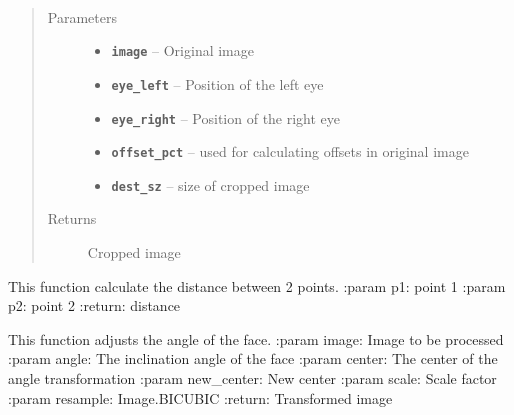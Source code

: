 \documentclass[letterpaper,10pt,english]{sphinxmanual}
\begin{document}
\begin{fulllineitems}
\label{Documentation of Code:preProcess.adjust.CropFace}~\begin{quote}\begin{description}
\item[{Parameters}] \leavevmode\begin{itemize}
\item {} 
\textbf{\texttt{image}} -- Original image

\item {} 
\textbf{\texttt{eye\_left}} -- Position of the left eye

\item {} 
\textbf{\texttt{eye\_right}} -- Position of the right eye

\item {} 
\textbf{\texttt{offset\_pct}} -- used for calculating offsets in original image

\item {} 
\textbf{\texttt{dest\_sz}} -- size of cropped image

\end{itemize}

\item[{Returns}] \leavevmode
Cropped image

\end{description}\end{quote}

\end{fulllineitems}


\begin{fulllineitems}
\label{Documentation of Code:preProcess.adjust.Distance}
This function calculate the distance between 2 points.
:param p1: point 1
:param p2: point 2
:return: distance

\end{fulllineitems}


\begin{fulllineitems}
\label{Documentation of Code:preProcess.adjust.ScaleRotateTranslate}
This function adjusts the angle of the face.
:param image: Image to be processed
:param angle: The inclination angle of the face
:param center: The center of the angle transformation
:param new\_center: New center
:param scale: Scale factor
:param resample: Image.BICUBIC
:return: Transformed image

\end{fulllineitems}
\end{document}
